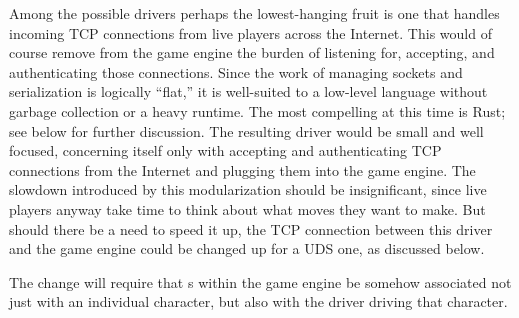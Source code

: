 Among the possible drivers perhaps the lowest-hanging fruit is one that
handles incoming TCP connections from live players across the Internet.
This would of course remove from the game engine the burden of listening for,
accepting, and authenticating those connections.
Since the work of managing sockets and serialization is logically ``flat,''
it is well-suited to a low-level language without garbage collection or a
heavy runtime.
The most compelling at this time is Rust;
see below for further discussion.
The resulting driver would be small and well focused, concerning itself
only with accepting and authenticating TCP connections from the Internet and
plugging them into the game engine.
The slowdown introduced by this modularization should be insignificant, since
live players anyway take time to think about what moves they want to make.
But should there be a need to speed it up, the TCP connection
between this driver and the game engine could be changed up for a UDS one,
as discussed below.

The change will require that s within the game engine be somehow
associated not just with an individual character, but also with the driver
driving that character.